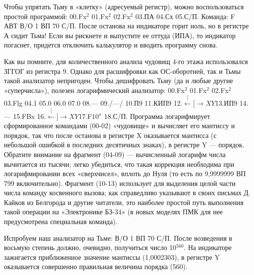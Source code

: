 \documentclass[11pt,a4paper,oneside]{article}
\def\XY{$\stackrel[\leftarrow]{\rightarrow}{XY}$}
\begin{document}
Чтобы упрятать Тьму в «клетку» (адресуемый регистр), можно воспользоваться простой программой: 00.Fx$^{2}$ 01.Fx$^{2}$ 02.Fx$^{2}$ 03.ПА 04.Сх 05.С/П. Команда: F АВТ В/О 1 ВП 70 С/П. После останова на индикаторе горит ноль, но в регистре А сидит Тьма! Если вы рискнете и выпустите ее оттуда (ИПА), то индикатор погаснет, придется отключить калькулятор и вводить программу снова.

Как вы помните, для количественного анализа чудовищ 4-го этажа использовался ЗГГОГ из регистра 9. Однако для расшифровки как ОС-оборотней, так и Тьмы такой анализатор непригоден. Чтобы дешифровать Тьму (да и любые другие «суперчисла»), полезен логарифмический анализатор: 00.Fx$^{2}$ 01.Fx$^{2}$ 02.Fx$^{2}$ 03.Flg 04.1 05.0 06.0 07.0 08.— 09./—/ 10.П9 11.КИП9 12.\XY 13.ИП9 14.— 15.FBx 16.\XY 17.F10$^{x}$ 18.С/П. Программа логарифмирует сформированное командами (00-02) «чудовище» и вычисляет его мантиссу и порядок, так что после останова в регистре X оказывается мантисса (с небольшой ошибкой в последних десятичных знаках), в регистре Y — порядок. Обратите внимание на фрагмент (04-09) — вычисленный логарифм числа вычитается из тысячи; легко убедиться, что такая коррекция необходима при логарифмировании всех «сверхчисел», вплоть до Нуля (то есть по 9,9999999 ВП 799 включительно). Фрагмент (10-13) использует для выделения целой части числа команду косвенного вызова; как справедливо указывают в своих письмах Д. Кайков из Белгорода и другие читатели, это наиболее простой путь выполнения такой операции на «Электронике БЗ-34» (в новых моделях ПМК для нее предусмотрена специальная команда).

Испробуем наш анализатор на Тьме: В/О 1 ВП 70 С/П. После возведения в восьмую степень должно, очевидно, получиться число 10$^{560}$. На индикаторе зажигается приближенное значение мантиссы (1,0002303), в регистре Y оказывается совершенно правильная величина порядка (560).
\end{document}
